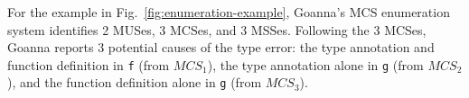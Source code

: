    For the example in Fig.~\ref{fig:enumeration-example}, Goanna's MCS enumeration system identifies 2 MUSes, 3 MCSes, and 3 MSSes. Following the 3 MCSes, Goanna reports 3 potential causes of the type error: the type annotation and function definition in \texttt{f} (from $MCS_1$), the type annotation alone in \texttt{g} (from $MCS_2$), and the function definition alone in \texttt{g} (from $MCS_3$). 
   
%
%

